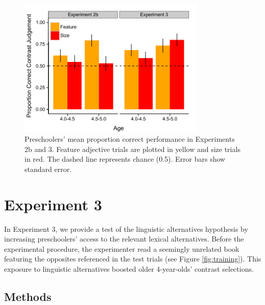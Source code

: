 \documentclass[10pt,letterpaper]{article}
\begin{document}
\begin{figure}[t] 
  \begin{center} 
    \includegraphics[width=3.5in]{figures/results_expt2b&3_n75.pdf} 
    \caption{\label{fig:kids2} Preschoolers' mean proportion correct performance in Experiments 2b and 3.  Feature adjective trials are plotted in yellow and size trials in red.
The dashed line represents chance (0.5). Error bars show standard error.}
  \end{center} 
\end{figure}

\section{Experiment 3} 




In Experiment 3, we provide a test of the linguistic alternatives hypothesis by increasing preschoolers' access to the relevant lexical alternatives.  Before the experimental procedure, the experimenter read a seemingly unrelated book featuring the opposites referenced in the test trials (see Figure \ref{fig:training}).  This exposure to linguistic alternatives boosted older 4-year-olds' contrast selections. 

\subsection{Methods}
\end{document}
